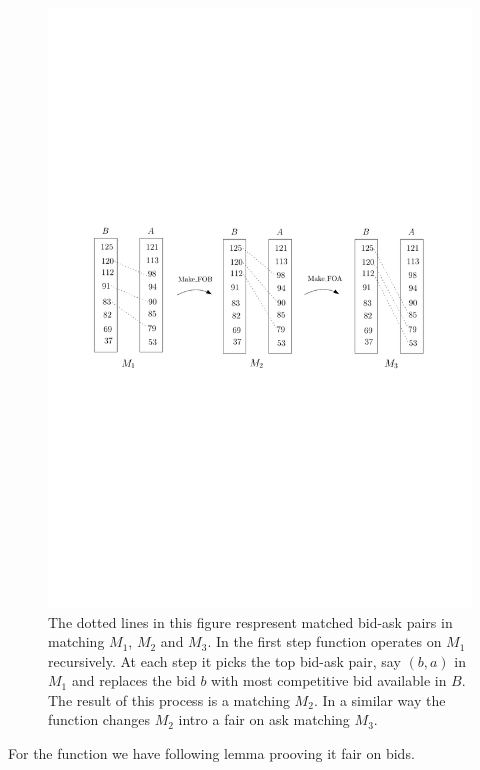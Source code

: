 \documentclass[a4paper,UKenglish,cleveref, autoref]{lipics-v2019}
\begin{document}
\begin{figure}[h!]
\centering
\includegraphics[width=.8\textwidth]{make_fair.pdf}
\caption{The dotted lines in this figure respresent  matched bid-ask pairs in  matching $M_1$, $M_2$ and $M_3$. In the first step function  operates on $M_1$ recursively. At each step it picks the top bid-ask pair, say $(b,a)$ in $M_1$ and replaces the bid  $b$ with most competitive bid available in $B$. The result of this process is a  matching $M_2$. In a similar way the function  changes $M_2$ intro a fair on ask matching $M_3$.  }
\label{fig:fair}
\end{figure}

For the function  we have following lemma prooving it fair on bids. 
\begin{lemma}\label{lem:fob}
\end{lemma}

\begin{lemma}\label{lem:foa}
\end{lemma}
\end{document}

